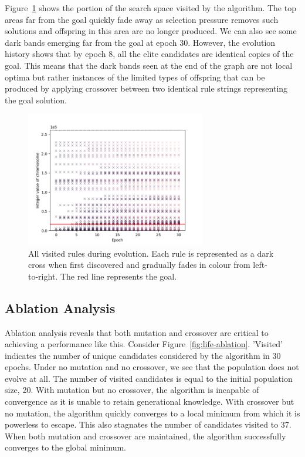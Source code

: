 Figure~\ref{fig:life-searchgraph} shows the portion of the search space visited by the algorithm. The top areas far from the goal quickly fade away as selection pressure removes such solutions and offspring in this area are no longer produced. We can also see some dark bands emerging far from the goal at epoch 30. However, the evolution history shows that by epoch 8, all the elite candidates are identical copies of the goal. This means that the dark bands seen at the end of the graph are not local optima but rather instances of the limited types of offspring that can be produced by applying crossover between two identical rule strings representing the goal solution.

\begin{figure}[H]
\centering
\includegraphics[width=0.7\textwidth]{images/life_like_eval/life-searchgraph.png}
\caption{All visited rules during evolution. Each rule is represented as a dark cross when first discovered and gradually fades in colour from left-to-right. The red line represents the goal.}
\label{fig:life-searchgraph}
\end{figure}

\subsection{Ablation Analysis}
Ablation analysis reveals that both mutation and crossover are critical to achieving a performance like this. Consider Figure~\ref{fig:life-ablation}. 'Visited' indicates the number of unique candidates considered by the algorithm in 30 epochs. Under no mutation and no crossover, we see that the population does not evolve at all. The number of visited candidates is equal to the initial population size, 20. With mutation but no crossover, the algorithm is incapable of convergence as it is unable to retain generational knowledge. With crossover but no mutation, the algorithm quickly converges to a local minimum from which it is powerless to escape. This also stagnates the number of candidates visited to 37. When both mutation and crossover are maintained, the algorithm successfully converges to the global minimum.

